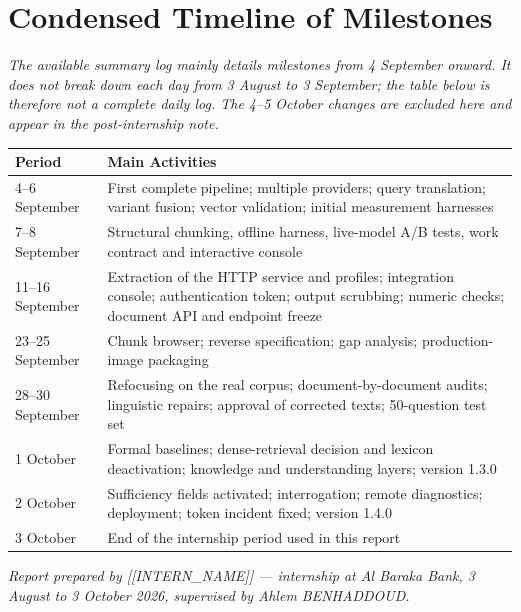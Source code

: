 \documentclass[a4paper,12pt,openany]{report}
\newcommand{\StudentName}{[[INTERN_NAME]]}
\newcommand{\HostOrganization}{Al Baraka Bank}
\newcommand{\SupervisorName}{Ahlem BENHADDOUD}
\newcommand{\InternshipPeriod}{3 August to 3 October 2026}
\begin{document}
\chapter{Condensed Timeline of Milestones}
\emph{The available summary log mainly details milestones from 4 September onward. It does not
break down each day from 3 August to 3 September; the table below is therefore not a complete daily
log. The 4--5 October changes are excluded here and appear in the post-internship note.}

\begin{table}[htbp]
\centering
\small
\begin{tabular}{p{2.6cm}p{12.0cm}}
\toprule
\textbf{Period} & \textbf{Main Activities} \\
\midrule
4--6 September & First complete pipeline; multiple providers; query translation; variant fusion;
vector validation; initial measurement harnesses \\
7--8 September & Structural chunking, offline harness, live-model A/B tests, work contract and
interactive console \\
11--16 September & Extraction of the HTTP service and profiles; integration console;
authentication token; output scrubbing; numeric checks; document API and endpoint freeze \\
23--25 September & Chunk browser; reverse specification; gap analysis; production-image packaging \\
28--30 September & Refocusing on the real corpus; document-by-document audits; linguistic repairs;
approval of corrected texts; 50-question test set \\
1 October & Formal baselines; dense-retrieval decision and lexicon deactivation; knowledge and
understanding layers; version 1.3.0 \\
2 October & Sufficiency fields activated; interrogation; remote diagnostics; deployment; token
incident fixed; version 1.4.0 \\
3 October & End of the internship period used in this report \\
\bottomrule
\end{tabular}
\end{table}

\vfill
\begin{center}
\small\emph{Report prepared by \StudentName{} — internship at \HostOrganization, \InternshipPeriod,
supervised by \SupervisorName.}
\end{center}
\end{document}
